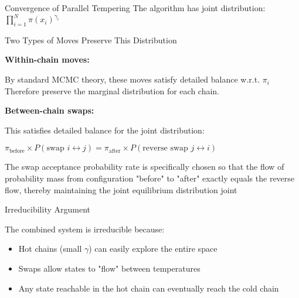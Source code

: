 \begin{frame}{Convergence of Parallel Tempering}
	The algorithm has  joint distribution: $\prod_{i=1}^N \pi(x_i)^{\gamma_i}$

	\vspace{0.5cm}
	Two Types of Moves Preserve This Distribution

	\vspace{0.25cm}
	\textbf{Within-chain moves:}

	By standard MCMC theory, these moves satisfy detailed balance w.r.t. $\pi_i$
	Therefore preserve the marginal distribution for each chain.

	\vspace{0.25cm}
	\textbf{Between-chain swaps:}

	This satisfies detailed balance for the joint distribution:

	$\pi_{\text{before}} \times P(\text{swap } i \leftrightarrow j) = \pi_{\text{after}} \times P(\text{reverse swap } j \leftrightarrow i)$

	The swap acceptance probability rate is specifically chosen so that the flow of probability
	mass from configuration "before" to "after" exactly equals the reverse flow,
	thereby maintaining the joint equilibrium distribution joint
\end{frame}

\begin{frame}
	Irreducibility Argument

	\vspace{0.5cm}
	The combined system is irreducible because:

	\vspace{0.5cm}
	\begin{itemize}
		\item Hot chains (small $\gamma$) can easily explore the entire space
		\item Swaps allow states to "flow" between temperatures
		\item Any state reachable in the hot chain can eventually reach the cold chain
	\end{itemize}
\end{frame}

